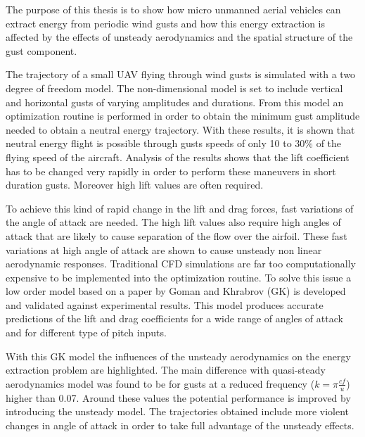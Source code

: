 \par The purpose of this thesis is to show how micro unmanned aerial vehicles can extract energy from periodic wind gusts and how this energy extraction is affected by the effects of unsteady aerodynamics and the spatial structure of the gust component.

\par The trajectory of a small UAV flying through wind gusts is simulated with a two degree of freedom model.
The non-dimensional model is set to include vertical and horizontal gusts of varying amplitudes and durations.
From this model an optimization routine is performed in order to obtain the minimum gust amplitude needed to obtain a neutral energy trajectory.
With these results, it is shown that neutral energy flight is possible through gusts speeds of only 10 to 30\% of the flying speed of the aircraft.
Analysis of the results shows that the lift coefficient has to be changed very rapidly in order to perform these maneuvers in short duration gusts. 
Moreover high lift values are often required. 

\par To achieve this kind of rapid change in the lift and drag forces, fast variations of the angle of attack are needed.
The high lift values also require high angles of attack that are likely to cause separation of the flow over the airfoil.
These fast variations at high angle of attack are shown to cause unsteady non linear aerodynamic responses.
Traditional CFD simulations are far too computationally expensive to be implemented into the optimization routine.
To solve this issue a low order model based on a paper by Goman and Khrabrov \cite{GK} (GK) is developed and validated against experimental results.
This model produces accurate predictions of the lift and drag coefficients for a wide range of angles of attack and for different type of pitch inputs.

\par With this GK model the influences of the unsteady aerodynamics on the energy extraction problem are highlighted.
The main difference with quasi-steady aerodynamics model was found to be for gusts at a reduced frequency ($k=\pi \frac{c f }{u}$) higher than 0.07.
Around these values the potential performance is improved by introducing the unsteady model.
The trajectories obtained include more violent changes in angle of attack in order to take full advantage of the unsteady effects.


